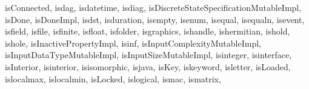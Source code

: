 {{        isConnected,%
        isdag,%
        isdatetime,%
        isdiag,%
        isDiscreteStateSpecificationMutableImpl,%
        isDone,%
        isDoneImpl,%
        isdst,%
        isduration,%
        isempty,%
        isenum,%
        isequal,%
        isequaln,%
        isevent,%
        isfield,%
        isfile,%
        isfinite,%
        isfloat,%
        isfolder,%
        isgraphics,%
        ishandle,%
        ishermitian,%
        ishold,%
        ishole,%
        isInactivePropertyImpl,%
        isinf,%
        isInputComplexityMutableImpl,%
        isInputDataTypeMutableImpl,%
        isInputSizeMutableImpl,%
        isinteger,%
        isinterface,%
        isInterior,%
        isinterior,%
        isisomorphic,%
        isjava,%
        isKey,%
        iskeyword,%
        isletter,%
        isLoaded,%
        islocalmax,%
        islocalmin,%
        isLocked,%
        islogical,%
        ismac,%
        ismatrix,%
}}
